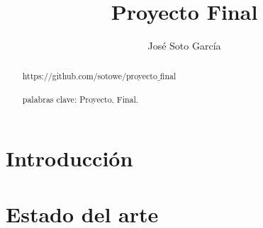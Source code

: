\documentclass[a4paper]{article}
\title{Proyecto Final}
\author{José Soto García}
\begin{document}
\maketitle
\begin{abstract}
https://github.com/sotowe/proyecto$\_$final\\\\
palabras clave: Proyecto, Final. 
\end{abstract}
\section{Introducción}
\section{Estado del arte}
\end{document}
